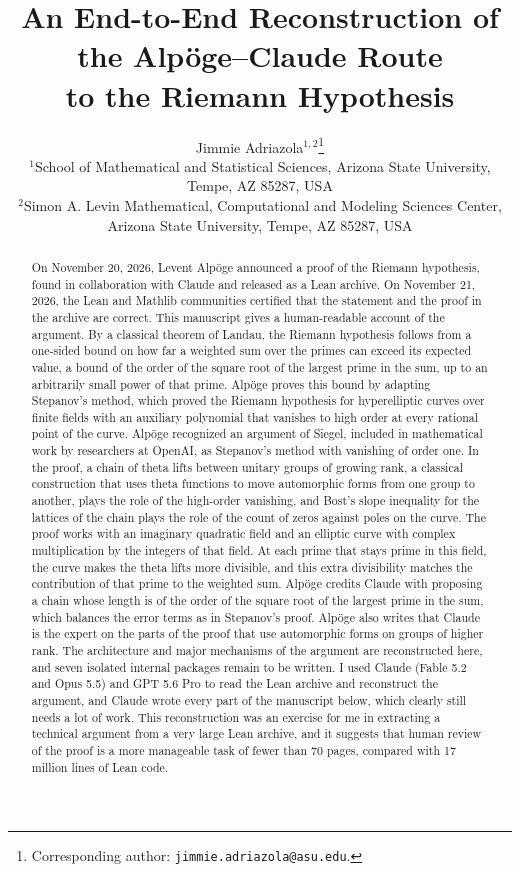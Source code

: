 \documentclass[11pt,letterpaper]{article}
\title{\bfseries An End-to-End Reconstruction of the Alp\"oge--Claude Route\\ to the Riemann Hypothesis}
\author{Jimmie Adriazola$^{1,2}$\thanks{Corresponding author: \texttt{jimmie.adriazola@asu.edu}.}\\[6pt]
\small $^1$School of Mathematical and Statistical Sciences, Arizona State University,\\[-2pt]
\small Tempe, AZ 85287, USA\\[3pt]
\small $^2$Simon A. Levin Mathematical, Computational and Modeling Sciences Center,\\[-2pt]
\small Arizona State University, Tempe, AZ 85287, USA}
\date{}
\numberwithin{equation}{section}
\begin{document}
\maketitle

\begin{abstract}
On November 20, 2026, Levent Alp\"oge announced a proof of the Riemann hypothesis, found in collaboration with Claude and released as a Lean archive. On November 21, 2026, the Lean and Mathlib communities certified that the statement and the proof in the archive are correct. This manuscript gives a human-readable account of the argument. By a classical theorem of Landau, the Riemann hypothesis follows from a one-sided bound on how far a weighted sum over the primes can exceed its expected value, a bound of the order of the square root of the largest prime in the sum, up to an arbitrarily small power of that prime. Alp\"oge proves this bound by adapting Stepanov's method, which proved the Riemann hypothesis for hyperelliptic curves over finite fields with an auxiliary polynomial that vanishes to high order at every rational point of the curve. Alp\"oge recognized an argument of Siegel, included in mathematical work by researchers at OpenAI, as Stepanov's method with vanishing of order one. In the proof, a chain of theta lifts between unitary groups of growing rank, a classical construction that uses theta functions to move automorphic forms from one group to another, plays the role of the high-order vanishing, and Bost's slope inequality for the lattices of the chain plays the role of the count of zeros against poles on the curve. The proof works with an imaginary quadratic field and an elliptic curve with complex multiplication by the integers of that field. At each prime that stays prime in this field, the curve makes the theta lifts more divisible, and this extra divisibility matches the contribution of that prime to the weighted sum. Alp\"oge credits Claude with proposing a chain whose length is of the order of the square root of the largest prime in the sum, which balances the error terms as in Stepanov's proof. Alp\"oge also writes that Claude is the expert on the parts of the proof that use automorphic forms on groups of higher rank. The architecture and major mechanisms of the argument are reconstructed here, and seven isolated internal packages remain to be written. I used Claude (Fable 5.2 and Opus 5.5) and GPT 5.6 Pro to read the Lean archive and reconstruct the argument, and Claude wrote every part of the manuscript below, which clearly still needs a lot of work. This reconstruction was an exercise for me in extracting a technical argument from a very large Lean archive, and it suggests that human review of the proof is a more manageable task of fewer than 70 pages, compared with 17 million lines of Lean code.
\end{abstract}
\end{document}

